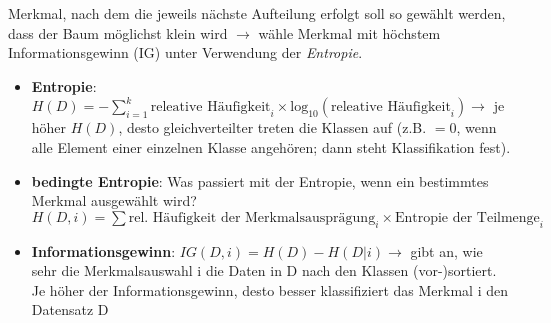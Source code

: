 Merkmal, nach dem die jeweils nächste Aufteilung erfolgt soll so gewählt werden, dass der Baum möglichst klein wird $\rightarrow$ wähle Merkmal mit höchstem Informationsgewinn (IG) unter Verwendung der \emph{Entropie}.
\begin{itemize}
    \item \textbf{Entropie}: $H(D)=-\sum^k_{i=1}\text{releative Häufigkeit}_i \times \text{log}_{10} (\text{releative Häufigkeit}_i) \rightarrow$ je höher $H(D)$, desto gleichverteilter treten die Klassen auf (z.B. $=0$, wenn alle Element einer einzelnen Klasse angehören; dann steht Klassifikation fest).
    \item \textbf{bedingte Entropie}: Was passiert mit der Entropie, wenn ein bestimmtes Merkmal ausgewählt wird? $H(D,i)=\sum \text{rel. Häufigkeit der Merkmalsausprägung}_i \times \text{Entropie der Teilmenge}_i$
    \item \textbf{Informationsgewinn}: $IG(D, i) = H(D) - H(D\vert i) \rightarrow$ gibt an, wie sehr die Merkmalsauswahl i die Daten in D nach den Klassen (vor-)sortiert. Je höher der Informationsgewinn, desto besser klassifiziert das Merkmal i den Datensatz D
\end{itemize}